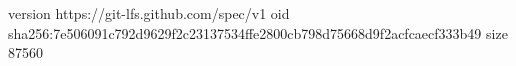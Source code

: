 version https://git-lfs.github.com/spec/v1
oid sha256:7e506091c792d9629f2c23137534ffe2800cb798d75668d9f2acfcaecf333b49
size 87560
